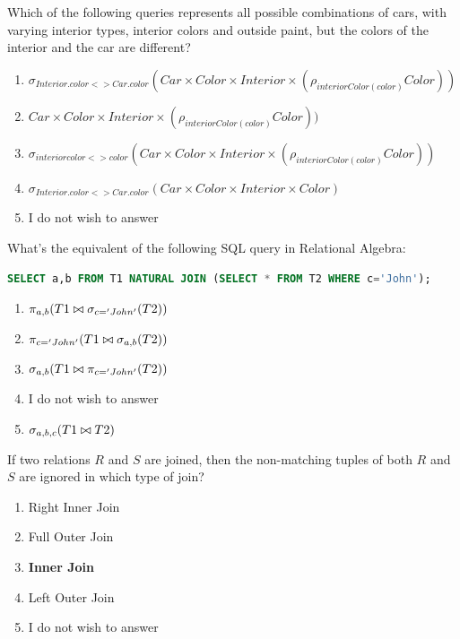 \documentclass{bdad}
\begin{document}
Which of the following queries represents all possible combinations of cars, with varying interior types, interior colors and outside paint, but the colors of the interior and the car are different? 

\begin{enumerate}
    \item $\sigma_{Interior.color <> Car.color} (Car \times Color \times Interior \times (\rho_{interiorColor(color)} Color))$
    \item $Car \times Color \times Interior \times (\rho_{interiorColor(color)} Color))$
    \item $\sigma_{interiorcolor <> color} (Car \times Color \times Interior \times (\rho_{interiorColor(color)} Color))$ \greencheckmark
    \item $\sigma_{Interior.color <> Car.color} (Car \times Color \times Interior \times Color)$
    \item I do not wish to answer
\end{enumerate}

What's the equivalent of the following SQL query in Relational Algebra:

\begin{lstlisting}[language=SQL, numbers=none, frame=none, belowskip=0pt]
SELECT a,b FROM T1 NATURAL JOIN (SELECT * FROM T2 WHERE c='John');
\end{lstlisting}

\begin{enumerate}
    \item $\pi_{a,b} (T1 \bowtie \sigma_{c='John'} (T2))$ \greencheckmark
    \item $\pi_{c='John'} (T1 \bowtie \sigma_{a,b} (T2))$
    \item $\sigma_{a,b} (T1 \bowtie \pi_{c='John'} (T2))$
    \item I do not wish to answer
    \item $\sigma_{a,b,c} (T1 \bowtie T2)$
\end{enumerate}

If two relations $R$ and $S$ are joined, then the non-matching tuples of both $R$ and $S$ are ignored in which type of join?

\begin{enumerate}
    \item Right Inner Join
    \item Full Outer Join
    \item \textbf{Inner Join \greencheckmark}
    \item Left Outer Join
    \item I do not wish to answer
\end{enumerate}
\end{document}
